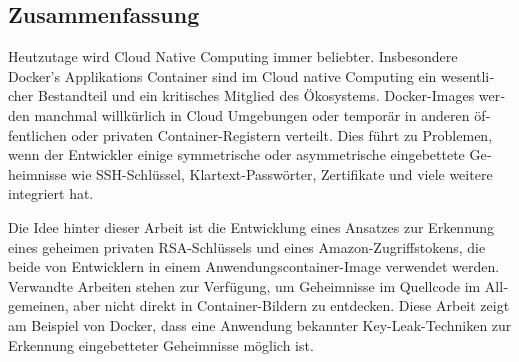 \begin{otherlanguage}{ngerman}
\chapter*{Zusammenfassung}
Heutzutage wird Cloud Native Computing immer beliebter. Insbesondere Docker's Applikations Container sind im Cloud native Computing ein wesentlicher Bestandteil und ein kritisches Mitglied des Ökosystems. 
Docker-Images werden manchmal willkürlich in Cloud Umgebungen oder temporär in anderen öffentlichen oder privaten Container-Registern verteilt. Dies führt zu Problemen, wenn der Entwickler einige symmetrische oder asymmetrische eingebettete Geheimnisse wie SSH-Schlüssel, Klartext-Passwörter, Zertifikate  und viele weitere integriert hat.

Die Idee hinter dieser Arbeit ist die Entwicklung eines Ansatzes zur Erkennung eines geheimen privaten RSA-Schlüssels und eines Amazon-Zugriffstokens, die beide von Entwicklern in einem Anwendungscontainer-Image verwendet werden. Verwandte Arbeiten stehen zur Verfügung, um Geheimnisse im Quellcode im Allgemeinen, aber nicht direkt in Container-Bildern zu entdecken. Diese Arbeit zeigt am Beispiel von Docker, dass eine Anwendung bekannter Key-Leak-Techniken zur Erkennung eingebetteter Geheimnisse möglich ist.
\end{otherlanguage}
